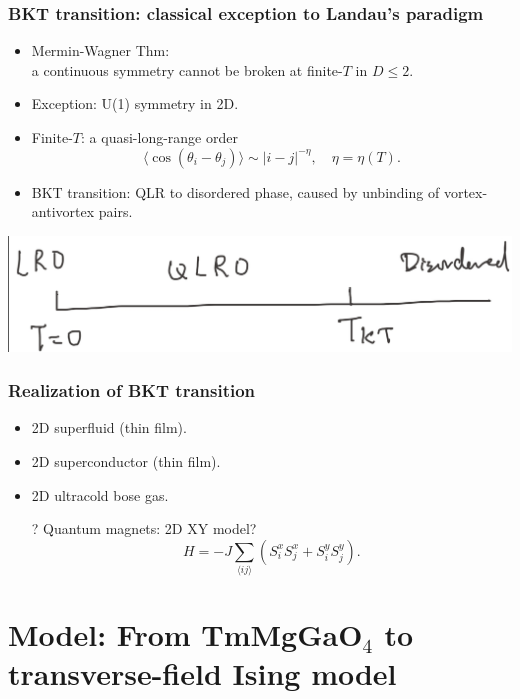 \documentclass[xcolor=table, aspectratio=1610,ignorenonframetext]{beamer}
\begin{document}
\begin{frame}
  \frametitle{BKT transition: classical exception to Landau's paradigm}
  \begin{itemize}
  \item Mermin-Wagner Thm:\\a continuous symmetry cannot be broken at finite-$T$ in $D\leq2$.
  \item Exception: U(1) symmetry in 2D.
  \item Finite-$T$: a quasi-long-range order
    \[\langle \cos(\theta_i-\theta_j)\rangle\sim |i-j|^{-\eta},\quad \eta=\eta(T).\]
  \item BKT transition: QLR to disordered phase, caused by unbinding of vortex-antivortex pairs.
  \end{itemize}
  \begin{center}
    \includegraphics[width=.6\textwidth]{kt-pd}
  \end{center}
\end{frame}

\begin{frame}
  \frametitle{Realization of BKT transition}
  \begin{itemize}
  \item 2D superfluid (thin film).
  \item 2D superconductor (thin film).
  \item 2D ultracold bose gas.
  \item[?] Quantum magnets: 2D XY model?
    \[H=-J\sum_{\langle ij\rangle}\left(S_i^xS_j^x + S_i^yS_j^y\right).\]  
  \end{itemize}
\end{frame}

\section{Model: From TmMgGaO${}_4$ to transverse-field Ising model}
\end{document}
